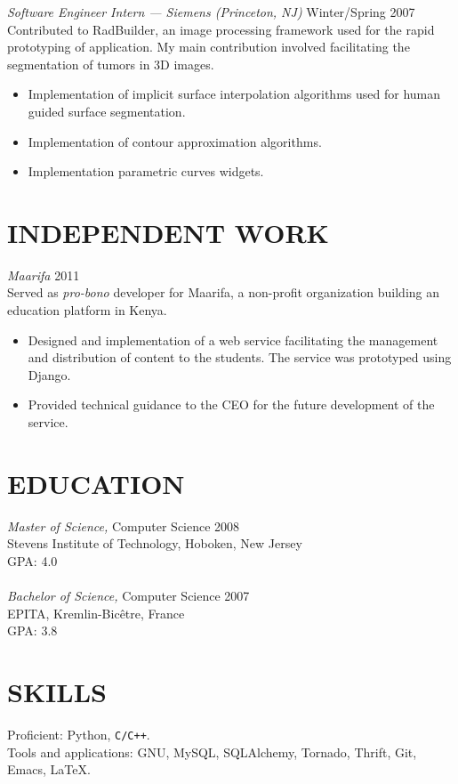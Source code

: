 \documentclass[line,margin]{src/res}
\begin{document}
\begin{resume}
                {\sl Software Engineer Intern --- Siemens (Princeton, NJ)} \hfill Winter/Spring 2007 \\
                Contributed to RadBuilder, an image processing framework used for the rapid prototyping of application. My main contribution involved facilitating the segmentation of tumors in 3D images.
                \begin{itemize}  \itemsep -2pt
                    \item Implementation of implicit surface interpolation algorithms used for human guided surface segmentation.
                    \item Implementation of contour approximation algorithms.
                    \item Implementation parametric curves widgets.
                \end{itemize}

\section{INDEPENDENT WORK}
                {\sl Maarifa} \hfill 2011 \\
                Served as \textit{pro-bono} developer for Maarifa, a non-profit organization building an education platform in Kenya.
                \begin{itemize}  \itemsep -2pt
                    \item Designed and implementation of a web service facilitating the management and distribution of content to the students. The service was prototyped using Django.
                    \item Provided technical guidance to the CEO for the future development of the service.
                \end{itemize}

\section{EDUCATION} 
                {\sl Master of Science,} Computer Science \hfill 2008 \\
                Stevens Institute of Technology, Hoboken, New Jersey \\
                GPA: 4.0 \\
                \vspace{1pt} \\
                {\sl Bachelor of Science,} Computer Science \hfill 2007 \\
                EPITA, Kremlin-Bic\^etre, France \\
                GPA: 3.8

\section{SKILLS}
                Proficient: Python, \texttt{C/C++}. \\
                Tools and applications: GNU, MySQL, SQLAlchemy, Tornado, Thrift,
                 Git, Emacs, \LaTeX. \\

\end{resume}
\end{document}
